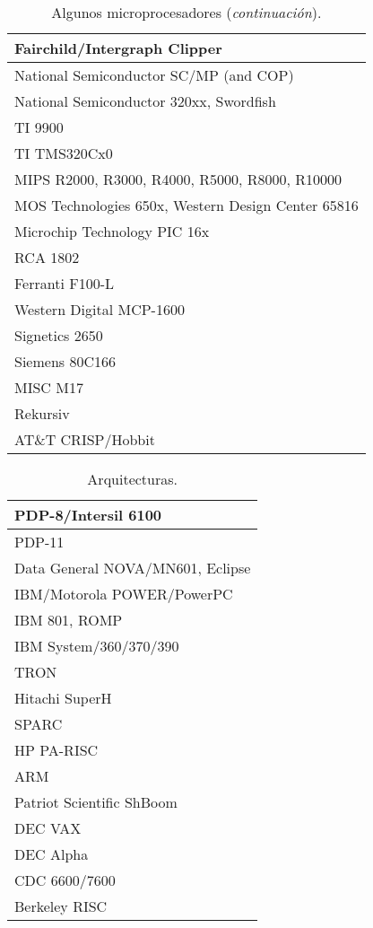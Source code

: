 \begin{table}[!htb]
\centering
\begin{tabular}{|l|} \hline
{\tiny Fairchild/Intergraph Clipper} \\ \hline
{\tiny National Semiconductor SC/MP (and COP)} \\ \hline 
{\tiny National Semiconductor 320xx, Swordfish} \\ \hline
{\tiny TI 9900} \\ \hline
{\tiny TI TMS320Cx0} \\ \hline
{\tiny MIPS R2000, R3000, R4000, R5000, R8000, R10000} \\ \hline
{\tiny MOS Technologies 650x, Western Design Center 65816} \\ \hline
{\tiny Microchip Technology PIC 16x} \\ \hline
{\tiny RCA 1802} \\ \hline
{\tiny Ferranti F100-L} \\ \hline
{\tiny Western Digital MCP-1600} \\ \hline
{\tiny Signetics 2650} \\ \hline
{\tiny Siemens 80C166} \\ \hline
{\tiny MISC M17} \\ \hline
{\tiny Rekursiv} \\ \hline
{\tiny AT\&T CRISP/Hobbit} \\ \hline
\end{tabular} 
\caption{Algunos microprocesadores ({\it continuaci\'on\/}).} 
\label{Micros2}
\end{table}

\begin{table}[!hbt]
\centering
\begin{tabular}{|l|} \hline
{\tiny PDP-8/Intersil 6100} \\ \hline
{\tiny PDP-11} \\ \hline
{\tiny Data General NOVA/MN601, Eclipse} \\ \hline
{\tiny IBM/Motorola POWER/PowerPC} \\ \hline
{\tiny IBM 801, ROMP} \\ \hline
{\tiny IBM System/360/370/390} \\ \hline
{\tiny TRON} \\ \hline
{\tiny Hitachi SuperH} \\ \hline 
{\tiny SPARC} \\ \hline
{\tiny HP PA-RISC} \\ \hline
{\tiny ARM} \\ \hline
{\tiny Patriot Scientific ShBoom} \\ \hline
{\tiny DEC VAX} \\ \hline
{\tiny DEC Alpha} \\ \hline
{\tiny CDC 6600/7600} \\ \hline
{\tiny Berkeley RISC} \\ \hline
\end{tabular}
\caption{Arquitecturas.} 
\label{Arquitecturas}
\end{table}

